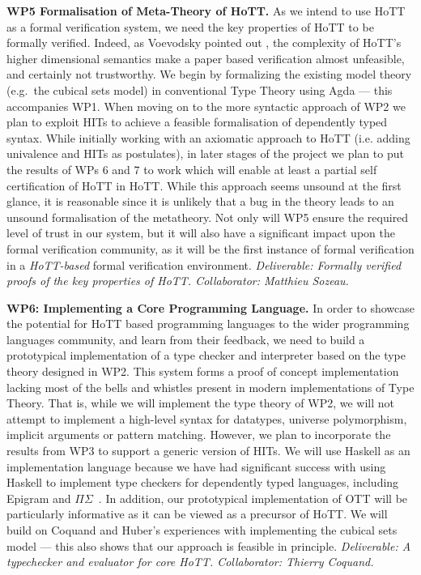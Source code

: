 \documentclass[a4paper,11pt]{article}
\newcommand{\eg}{{e.g.}\ }
\begin{document}
{\bf WP5 Formalisation of Meta-Theory of HoTT.}  As we intend to use
HoTT as a formal verification system, we need the key properties of
HoTT to be formally verified. Indeed, as Voevodsky pointed out
\cite{voevodsky-ias14}, the complexity of HoTT's higher dimensional
semantics make a paper based verification almost unfeasible, and
certainly not trustworthy. We begin by formalizing the existing model
theory (\eg the cubical sets model) in conventional Type Theory using
Agda --- this accompanies WP1. When moving on to the more syntactic
approach of WP2 we plan to exploit HITs to achieve a feasible
formalisation of dependently typed syntax. While initially working
with an axiomatic approach to HoTT (i.e. adding univalence and HITs as
postulates), in later stages of the project we plan to put the results
of WPs 6 and 7 to work which will enable at least a partial self
certification of HoTT in HoTT.  While this approach seems unsound at
the first glance, it is reasonable since it is unlikely that a bug in
the theory leads to an unsound formalisation of the metatheory.  Not
only will WP5 ensure the required level of trust in our system, but it
will also have a significant impact upon the formal verification
community, as it will be the first instance of formal verification in
a {\em HoTT-based} formal verification environment. {\em Deliverable:
  Formally verified proofs of the key properties of
  HoTT. Collaborator: Matthieu Sozeau.}


{\bf WP6: Implementing a Core Programming Language.} In order to showcase
the potential for HoTT based programming languages to the wider
programming languages community, and learn from their feedback, we
need to build a prototypical implementation of a type checker and
interpreter based on the type theory designed in WP2.  This system
forms a proof of concept implementation lacking most of the bells
and whistles present in modern implementations of Type Theory. That
is, while we will implement the type theory of WP2, we will not
attempt to implement a high-level syntax for datatypes, universe
polymorphism, implicit arguments or pattern matching. However, we plan
to incorporate the results from WP3 to support a generic version of
HITs. We will use Haskell as an implementation language because
we have had significant success with using Haskell to implement type
checkers for dependently typed languages, including Epigram and
$\Pi\Sigma$~\cite{alti:checking,easy,alti:pisigma-new}.
In addition, our prototypical implementation of OTT will be
particularly informative as it can be viewed as a precursor of HoTT.
%
We will build on Coquand and Huber's experiences with implementing the
cubical sets model --- this also shows that our approach is feasible in
principle.  {\em Deliverable: A typechecker and evaluator for core
  HoTT. Collaborator: Thierry Coquand.}
\end{document}
